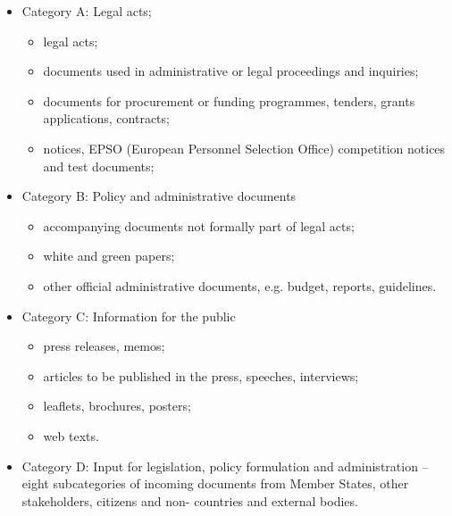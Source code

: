 \documentclass[output=paper]{langsci/langscibook}
\begin{document}
\begin{itemize}
\item Category A: Legal acts;
\begin{itemize}
\item 
{} legal acts; 
\item 
documents used in administrative or legal proceedings and inquiries; 
\item 
documents for procurement or funding programmes, tenders, grants applications, contracts; 
\item 
{} notices, EPSO (European Personnel Selection Office) competition notices and test documents;
\end{itemize}

\item Category B: Policy and administrative documents

\begin{itemize}
\item 
accompanying documents not formally part of legal acts; 
\item 
white and green papers; 
\item 
other official administrative documents, e.g. budget, reports, guidelines.
\end{itemize}

\item Category C: Information for the public

\begin{itemize}
\item 
press releases, memos; 
\item 
articles to be published in the press, speeches, interviews;
\item 
leaflets, brochures, posters;
\item 
web texts. 
\end{itemize}

\item Category D: Input for  legislation, policy formulation and administration – eight subcategories of incoming documents from Member States, other stakeholders, citizens and non- countries and external bodies.
\end{itemize}
\end{document}
